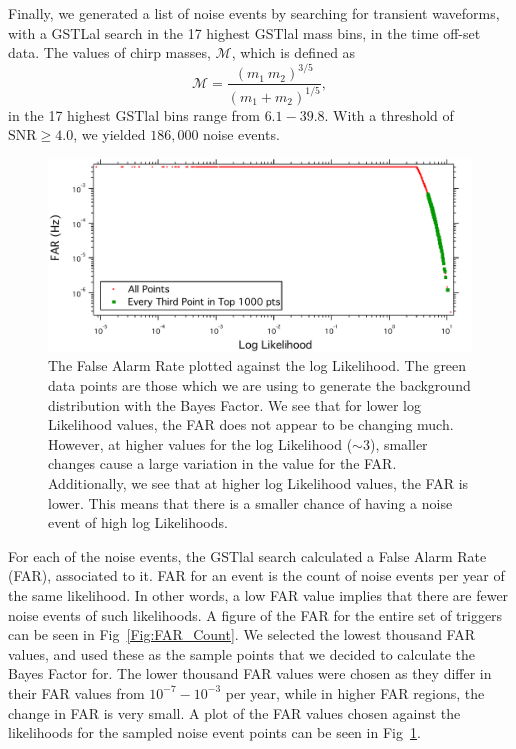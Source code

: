 \documentclass{article}
\begin{document}
 
 Finally, we generated a list of noise events by searching for transient waveforms, with a GSTLal search in the 17 highest GSTlal mass bins, in the time off-set data. The values of chirp masses, $\mathcal{M}$, which is defined as $$\mathcal{M} = \frac{(m_1 \ m_2)^{3/5}}{(m_1 + m_2)^{1/5}},$$ in the 17 highest GSTlal bins range from $6.1 - 39.8$. With a threshold of $\text{SNR} \geq 4.0$, we yielded $186,000$ noise events. \\ 
 

 
 
   \begin{figure}[h]
   	\centering
   	\includegraphics[width=1\textwidth]{Figures/sampledPts.pdf} 
   	\caption{The False Alarm Rate plotted against the log Likelihood. The green data points are those which we are using to generate the background distribution with the Bayes Factor. We see that for lower log Likelihood values, the FAR does not appear to be changing much. However, at higher values for the log Likelihood ($\sim3$), smaller changes cause a large variation in the value for the FAR. Additionally, we see that at higher log Likelihood values, the FAR is lower. This means that there is a smaller chance of having a noise event of high log Likelihoods.}
   	\label{Fig:sampledPts}
   \end{figure}
   
   
 
 For each of the noise events, the GSTlal search calculated a False Alarm Rate (FAR), associated to it. FAR for an event is the count of noise events per year of the same likelihood. In other words, a low FAR value implies that there are fewer noise events of such likelihoods. A figure of the FAR for the entire set of triggers can be seen in Fig~\ref{Fig:FAR_Count}. We selected the lowest thousand FAR values, and used these as the sample points that we decided to calculate the Bayes Factor for. The lower thousand FAR values were chosen as they differ in their FAR values from $10^{-7} - 10^{-3}$ per year, while in higher FAR regions, the change in FAR is very small. A plot of the FAR values chosen against the likelihoods for the sampled noise event points can be seen in Fig~\ref{Fig:sampledPts}.  \\
 
\end{document}
